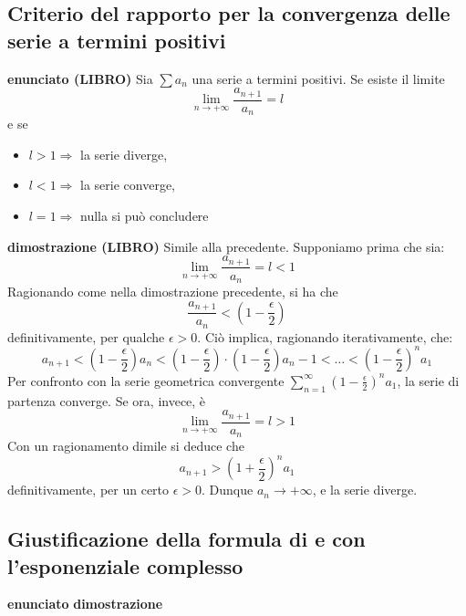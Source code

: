 \documentclass[a4paper, 9pt]{report}
\begin{document}
\subsection*{Criterio del rapporto per la convergenza delle serie a termini positivi}
\textbf{enunciato (LIBRO)}\newline
Sia $\sum a_n$ una serie a termini positivi. Se esiste il limite
\[
    \lim_{n\rightarrow +\infty}  \frac{a_{n+1}}{a_n} = l
\]
e se 
\begin{itemize}
    \item $l>1 \Rightarrow $ la serie diverge,
    \item $l<1 \Rightarrow $ la serie converge,
    \item $l=1 \Rightarrow $ nulla si può concludere
\end{itemize}
\textbf{dimostrazione (LIBRO)}\newline
Simile alla precedente. Supponiamo prima che sia:
\[
    \lim_{n\rightarrow +\infty} \frac{a_{n+1}}{a_n} = l < 1
\]
Ragionando come nella dimostrazione precedente, si ha che
\[
    \frac{a_{n+1}}{a_n} < \left(1-\frac{\epsilon}{2}\right)
\]
definitivamente, per qualche $\epsilon>0$. Ciò implica, ragionando iterativamente, che:
\[
    a_{n+1} < \left(1-\frac{\epsilon}{2}\right)a_n< \left(1-\frac{\epsilon}{2}\right) \cdot  \left(1-\frac{\epsilon}{2}\right) a_n-1 < \dots < \left(1-\frac{\epsilon}{2}\right)^n  a_1
\]
Per confronto con la serie geometrica convergente $\sum_{n=1}^{\infty}\left(1-\frac{\epsilon}{2}\right)^n a_1$, la serie di partenza converge.\newline
Se ora, invece, è
\[
    \lim_{n\rightarrow +\infty} \frac{a_{n+1}}{a_n} = l > 1
\]
Con un ragionamento dimile si deduce che 
\[
    a_{n+1} > \left(1+\frac{\epsilon}{2}\right)^n a_1
\]
definitivamente, per un certo $\epsilon>0$. Dunque $a_n \rightarrow +\infty $, e la serie diverge.







\newpage
\subsection*{Giustificazione della formula di e con l’esponenziale complesso}
\textbf{enunciato}\newline
\textbf{dimostrazione}\newline






\newpage
\end{document}
